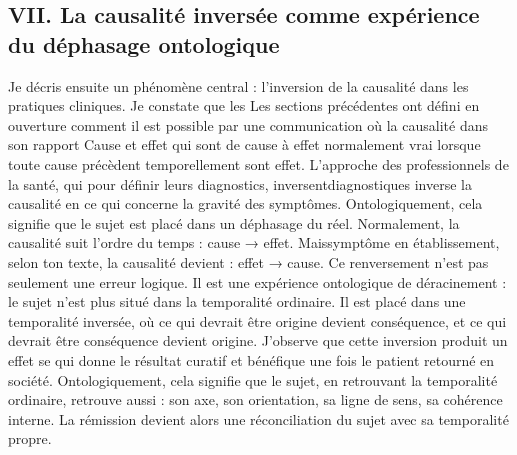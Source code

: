 \documentclass[12pt,a4paper]{article}
\begin{document}
\subsection*{VII. La causalité inversée comme expérience du déphasage ontologique}
Je décris ensuite un phénomène central : l’inversion de la causalité dans les pratiques cliniques. Je constate que les
Les sections précédentes ont défini en ouverture comment il est possible par une communication où la causalité dans son rapport Cause et effet qui sont de cause à effet normalement vrai lorsque toute cause précèdent temporellement sont effet. L’approche des professionnels de la santé, qui pour définir leurs diagnostics, inversentdiagnostiques inverse la causalité en ce qui concerne la gravité des symptômes. Ontologiquement, cela signifie que le sujet est placé dans un déphasage du réel.
Normalement, la causalité suit l’ordre du temps : cause → effet.
Maissymptôme en établissement, selon ton texte, la causalité devient : effet → cause.
Ce renversement n’est pas seulement une erreur logique. Il est une expérience ontologique de déracinement : le sujet n’est plus situé dans la temporalité ordinaire. Il est placé dans une temporalité inversée, où ce qui devrait être origine devient conséquence, et ce qui devrait être conséquence devient origine.
J’observe que cette inversion produit un effet se qui donne le résultat curatif et bénéfique une fois le patient retourné en société. Ontologiquement, cela signifie que le sujet, en retrouvant la temporalité ordinaire, retrouve aussi :
	son axe,
	son orientation,
	sa ligne de sens,
	sa cohérence interne.
La rémission devient alors une réconciliation du sujet avec sa temporalité propre.
\end{document}
